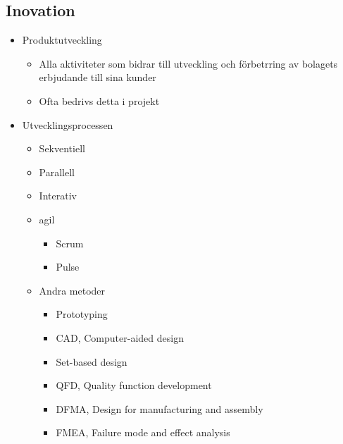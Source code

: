 \subsection{Inovation}
\begin{itemize}
    \item Produktutveckling
    \begin{itemize}
        \item Alla aktiviteter som bidrar till utveckling och förbetrring av bolagets erbjudande till sina kunder
        \item Ofta bedrivs detta i projekt
    \end{itemize}
    \item Utvecklingsprocessen
    \begin{itemize}
        \item Sekventiell
        \item Parallell
        \item Interativ
        \item agil
        \begin{itemize}
            \item Scrum 
            \item Pulse
        \end{itemize}
        \item Andra metoder
        \begin{itemize}
            \item Prototyping
            \item CAD, Computer-aided design
            \item Set-based design
            \item QFD, Quality function development
            \item DFMA, Design for manufacturing and assembly
            \item FMEA, Failure mode and effect analysis 
        \end{itemize}
    \end{itemize}
\end{itemize}


